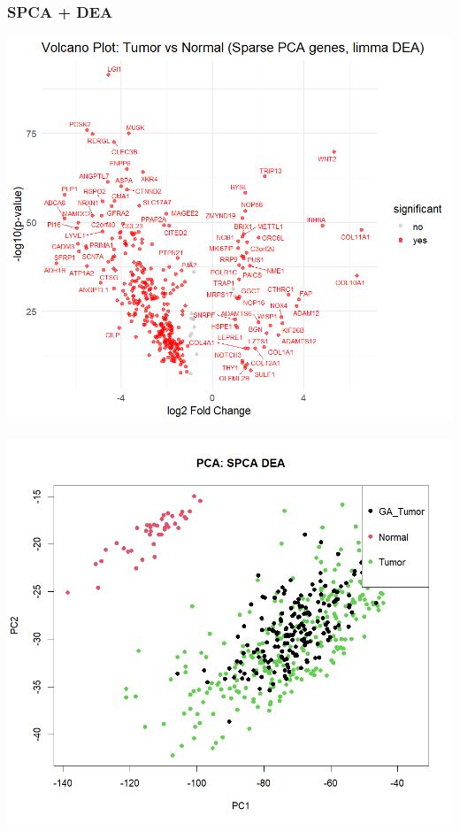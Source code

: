 \documentclass[12pt, aspectratio=43]{beamer}
\begin{document}
	\begin{frame}
		\frametitle{SPCA + DEA}
		
		\begin{minipage}[t]{0.50\textwidth} 
			\centering
			\label{fig:gene-a}
			\vspace{0.5em}
			\includegraphics[width=\linewidth]{volcano_spca.png}
			
		\end{minipage}
		\begin{minipage}[t]{0.50\textwidth} 
			\centering
			
			\label{fig:gene-a}
			\vspace{0.5em}
			\includegraphics[width=\linewidth]{spca_dea_pca.png}			
		\end{minipage}%
		
	\end{frame}
	
\end{document}
